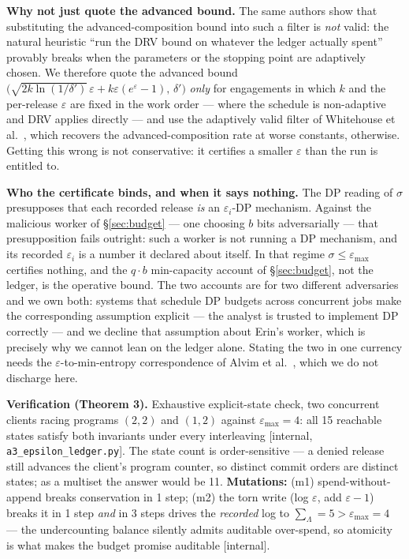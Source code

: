\documentclass[11pt,a4paper]{article}
\begin{document}
\textbf{Why not just quote the advanced bound.} The same authors show that substituting the advanced-composition bound into such a filter is \emph{not} valid: the natural
heuristic ``run the DRV bound on whatever the ledger actually spent'' provably breaks when the parameters or the stopping
point are adaptively chosen. We therefore quote the advanced bound
$\bigl(\sqrt{2k\ln(1/\delta')}\,\varepsilon+k\varepsilon(e^\varepsilon-1),\,\delta'\bigr)$ \cite{drv} \emph{only} for
engagements in which $k$ and the per-release $\varepsilon$ are fixed in the work order --- where the schedule is
non-adaptive and DRV applies directly --- and use the adaptively valid filter of Whitehouse et al.\ \cite{wrrw23}, which
recovers the advanced-composition rate at worse constants, otherwise. Getting this wrong is not conservative: it certifies a
smaller $\varepsilon$ than the run is entitled to.

\textbf{Who the certificate binds, and when it says nothing.} The DP reading of $\sigma$ presupposes that each recorded
release \emph{is} an $\varepsilon_i$-DP mechanism. Against the malicious worker of \S\ref{sec:budget} --- one choosing $b$
bits adversarially --- that presupposition fails outright: such a worker is not running a DP mechanism, and its recorded
$\varepsilon_i$ is a number it declared about itself. In that regime $\sigma\le\varepsilon_{\max}$ certifies nothing, and the
$q\cdot b$ min-capacity account of \S\ref{sec:budget}, not the ledger, is the operative bound. The two accounts are for two
different adversaries and we own both: systems that schedule DP budgets across concurrent jobs make the corresponding
assumption explicit --- the analyst is trusted to implement DP correctly \cite{pkube21} --- and we decline that assumption
about Erin's worker, which is precisely why we cannot lean on the ledger alone. Stating the two in one currency needs the
$\varepsilon$-to-min-entropy correspondence of Alvim et al.\ \cite{aacp11}, which we do not discharge here.

\begin{thebox}
\textbf{Verification (Theorem 3).} Exhaustive explicit-state check, two concurrent clients racing programs $(2,2)$ and $(1,2)$ against
$\varepsilon_{\max}=4$: all 15 reachable states satisfy both invariants under every interleaving [internal,
\texttt{a3\_epsilon\_ledger.py}]. The state count is order-sensitive --- a denied release still advances the client's program
counter, so distinct commit orders are distinct states; as a multiset the answer would be 11. \textbf{Mutations:} (m1) spend-without-append breaks
conservation in 1 step; (m2) the torn write (log $\varepsilon$, add $\varepsilon-1$) breaks it in 1 step \emph{and} in 3 steps
drives the \emph{recorded} log to $\sum_\Lambda=5>\varepsilon_{\max}=4$ --- the undercounting balance silently admits auditable
over-spend, so atomicity is what makes the budget promise auditable [internal].
\end{thebox}
\end{document}
